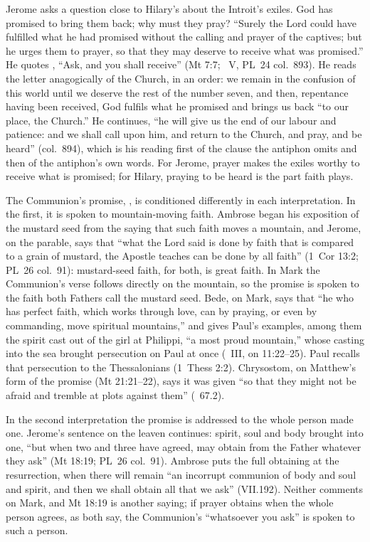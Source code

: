 Jerome asks a question close to Hilary's about the Introit's exiles. God has
promised to bring them back; why must they pray? ``Surely the Lord could have
fulfilled what he had promised without the calling and prayer of the
captives; but he urges them to prayer, so that they may deserve to receive
what was promised.'' He quotes , ``Ask, and you
shall receive'' (Mt 7:7; ~V, PL~24 col.~893). He reads the
letter anagogically of the Church, in an order: we remain in the confusion of
this world until we deserve the rest of the number seven, and then,
repentance having been received, God fulfils what he promised and brings us
back ``to our place, the Church.'' He continues, ``he will give us the end of
our labour and patience: and we shall call upon him, and return to the
Church, and pray, and be heard'' (col.~894), which is his reading first of the
clause the antiphon omits and then of the antiphon's own words. For Jerome,
prayer makes the exiles worthy to receive what is promised; for Hilary,
praying to be heard is the part faith plays.

The Communion's promise, , is conditioned
differently in each interpretation. In the first, it is spoken to
mountain-moving faith. Ambrose began his exposition of the mustard seed from
the saying that such faith moves a mountain, and Jerome, on the parable, says
that ``what the Lord said is done by faith that is compared to a grain of
mustard, the Apostle teaches can be done by all faith'' (1~Cor 13:2; PL~26
col.~91): mustard-seed faith, for both, is great faith. In Mark the
Communion's verse follows directly on the mountain, so the promise is spoken
to the faith both Fathers call the mustard seed. Bede, on Mark, says that ``he
who has perfect faith, which works through love, can by praying, or even by
commanding, move spiritual mountains,'' and gives Paul's examples, among them
the spirit cast out of the girl at Philippi, ``a most proud mountain,'' whose
casting into the sea brought persecution on Paul at once (~III, on 11:22--25). Paul recalls that persecution to the
Thessalonians (1~Thess 2:2). Chrysostom, on Matthew's form of the promise (Mt
21:21--22), says it was given ``so that they might not be afraid and tremble
at plots against them'' (~67.2).

In the second interpretation the promise is addressed to the whole person
made one. Jerome's
sentence on the leaven continues: spirit, soul and body brought into one, ``but
when two and three have agreed, may obtain from the Father whatever they ask''
(Mt 18:19; PL~26 col.~91). Ambrose puts the full obtaining at the
resurrection, when there will remain ``an incorrupt communion of body and soul
and spirit, and then we shall obtain all that we ask'' (VII.192). Neither
comments on Mark, and Mt 18:19 is another saying; if prayer obtains when the
whole person agrees, as both say, the Communion's ``whatsoever you ask'' is
spoken to such a person.


